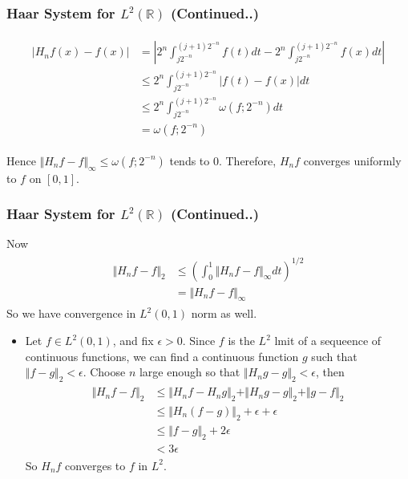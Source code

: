 \documentclass{beamer}
\begin{document}
\begin{frame}
    \frametitle{ Haar System for  $L^2\left({\mathbb{R}}\right)$ (Continued..)}
    \begin{eqnarray*}
        \begin{split}
            |H_nf(x) - f(x)| &= |2^n\int_{j2^{-n}}^{(j+1)2^{-n}}f(t)dt-2^n\int_{j2^{-n}}^{(j+1)2^{-n}}f(x)dt| \\
            &\le 2^n \int_{j2^{-n}}^{(j+1)2^{-n}}|f(t) - f(x)|dt \\
            &\le 2^n \int_{j2^{-n}}^{(j+1)2^{-n}}\omega(f;2^{-n})dt \\
            &= \omega(f;2^{-n})
        \end{split}
    \end{eqnarray*}

    Hence $\Vert H_nf - f \Vert_{\infty} \le \omega(f;2^{-n})$ tends to 0. Therefore, $H_nf$ converges uniformly to $f$ on $[0, 1]$.
\end{frame}


\begin{frame}
    \frametitle{Haar System for  $L^2\left({\mathbb{R}}\right)$ (Continued..)}
    Now
    \begin{eqnarray*}
        \begin{split}
            \Vert H_nf - f \Vert_{2} &\le \left(\int_0^1 \Vert H_nf - f \Vert_{\infty}dt \right)^{1/2}\\
            &= \Vert H_nf - f \Vert_{\infty}
        \end{split}
    \end{eqnarray*}
So we have convergence in $L^2(0,1)$ norm as well.
\begin{itemize}
    \item Let  $f \in L^2(0,1)$, and fix $ \epsilon > 0$. Since $f$ is the $L^2$ lmit of a sequeence of 
    continuous functions, we can find a continuous function $g$ such that $\Vert f - g \Vert_2 < \epsilon$. Choose $n$ large enough so that
    $\Vert H_ng - g \Vert_2 < \epsilon$, then
    \begin{eqnarray*}
        \begin{split}
            \Vert H_nf - f \Vert_{2} &\le \Vert H_nf - H_ng \Vert_2 + \Vert H_ng- g \Vert_2  + \Vert g -f \Vert_2 \\
            &\le \Vert H_n(f- g)\Vert_2 + \epsilon + \epsilon \\
            &\le \Vert f- g\Vert_2 +  2\epsilon \\
            &< 3\epsilon
        \end{split}
    \end{eqnarray*}
    So $H_nf$ converges to $f$  in $L^2$.
\end{itemize}
\end{frame}
    
\end{document}
